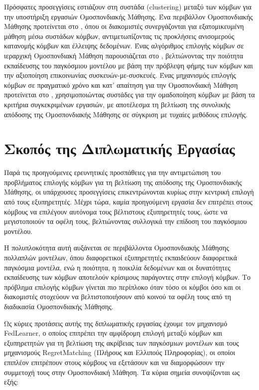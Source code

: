 Πρόσφατες προσεγγίσεις εστιάζουν στη συστάδα (clustering) μεταξύ των κόμβων για την υποστήριξη εργασιών Ομοσπονδιακής Μάθησης. Ένα περιβάλλον Ομοσπονδιακής Μάθησης προτείνεται στο , όπου οι διακομιστές συνεργάζονται για εξατομικευμένη μάθηση μέσω συστάδων κόμβων, αντιμετωπίζοντας τις προκλήσεις ανισομερούς κατανομής κόμβων και έλλειψης δεδομένων. Ένας αλγόριθμος επιλογής κόμβων σε ιεραρχική Ομοσπονδιακή Μάθηση παρουσιάζεται στο , βελτιώνοντας την ποιότητα εκπαίδευσης του παγκόσμιου μοντέλου με βάση την πρόβλεψη φήμης των κόμβων και την αξιοποίηση επικοινωνίας συσκευών-με-συσκευές. Ένας μηχανισμός επιλογής κόμβων σε πραγματικό χρόνο και κατ' απαίτηση για την Ομοσπονδιακή Μάθηση προτείνεται στο , χρησιμοποιώντας συστάδες για την ομαδοποίηση κόμβων με βάση τα κριτήρια συγκεκριμένων εργασιών, με αποτέλεσμα τη βελτίωση της συνολικής απόδοσης της Ομοσπονδιακής Μάθησης σε σύγκριση με τυχαίες μεθόδους επιλογής.

\section{Σκοπός της Διπλωματικής Εργασίας}

Παρά τις προηγούμενες ερευνητικές προσπάθειες για την αντιμετώπιση του προβλήματος επιλογής κόμβων για τη βελτίωση της απόδοσης της Ομοσπονδιακής Μάθησης, οι υπάρχουσες προσεγγίσεις επικεντρώνονται κυρίως στην κεντρική επιλογή από τους εξυπηρετητές. Μέχρι τώρα, καμία προηγούμενη εργασία δεν επιτρέπει στους κόμβους να επιλέγουν αυτόνομα τους βέλτιστους εξυπηρετητές τους, ώστε να μεγιστοποιούν τα οφέλη τους, βελτιώνοντας συλλογικά την επίδοση του παγκόσμιου μοντέλου. 

Η πολυπλοκότητα αυτή αυξάνεται σε περιβάλλοντα Ομοσπονδιακής Μάθησης πολλαπλών μοντέλων, όπου διαφορετικοί εξυπηρετητές εκπαιδεύουν διαφορετικά παγκόσμια μοντέλα, ενώ η ποιότητα, η ποικιλία δεδομένων και οι δυνατότητες εκπαίδευσης των κόμβων αποτελούν κρίσιμους παράγοντες στην επιλογή κόμβων. Το πρόβλημα επιλογής κόμβων γίνεται πιο περίπλοκο όταν τόσο οι κόμβοι όσο και οι διακομιστές στοχεύουν να βελτιστοποιήσουν από κοινού τα οφέλη τους από τη διαδικασία Ομοσπονδιακής Μάθησης.

Ως κύριες προτάσεις αυτής της διπλωματικής εργασίας έχουμε τον μηχανισμό FedLearner, ο οποίος επιτρέπει την αμφίδρομη επιλογή μεταξύ κόμβων και εξυπηρετητών για τη βελτίωση της ακρίβειας των παγκόσμιων μοντέλων και τους μηχανισμούς RegretMatching (Πλήρους και Ελλιπούς Πληροφορίας), οι οποίοι επιπλέον επιτρέπουν στους κόμβους να εξετάσουν και να διαμορφώσουν την συμμετοχή τους στην Ομοσπονδιακή Μάθηση. Τα κύρια σημεία συνοψίζονται ως εξής:

